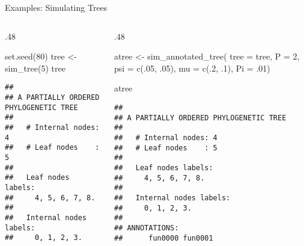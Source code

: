 \documentclass[9pt,handout,ignorenonframetext,]{beamer}
\newenvironment{Shaded}{\begin{snugshade}}{\end{snugshade}}
\newcommand{\KeywordTok}[1]{\textcolor[rgb]{0.94,0.87,0.69}{#1}}
\newcommand{\DataTypeTok}[1]{\textcolor[rgb]{0.87,0.87,0.75}{#1}}
\newcommand{\DecValTok}[1]{\textcolor[rgb]{0.86,0.86,0.80}{#1}}
\newcommand{\StringTok}[1]{\textcolor[rgb]{0.80,0.58,0.58}{#1}}
\newcommand{\NormalTok}[1]{\textcolor[rgb]{0.80,0.80,0.80}{#1}}
\def\begincols{\begin{columns}[T]}
\def\begincol{\begin{column}[T]}
\def\endcol{\end{column}}
\def\endcols{\end{columns}}
\begin{document}
\begin{frame}[fragile,t]{Examples: Simulating Trees}

\begincols

\begincol{.48\textwidth}

\footnotesize

\begin{Shaded}
\begin{Highlighting}[]
\KeywordTok{set.seed}\NormalTok{(}\DecValTok{80}\NormalTok{)}
\NormalTok{tree <-}\StringTok{ }\KeywordTok{sim_tree}\NormalTok{(}\DecValTok{5}\NormalTok{)}
\NormalTok{tree}
\end{Highlighting}
\end{Shaded}

\begin{verbatim}
## 
## A PARTIALLY ORDERED PHYLOGENETIC TREE
## 
##   # Internal nodes: 4
##   # Leaf nodes    : 5
## 
##   Leaf nodes labels: 
##     4, 5, 6, 7, 8.
## 
##   Internal nodes labels:
##     0, 1, 2, 3.
\end{verbatim}

\normalsize

\endcol

\begincol{.48\textwidth}

\footnotesize

\begin{Shaded}
\begin{Highlighting}[]
\NormalTok{atree <-}\StringTok{ }\KeywordTok{sim_annotated_tree}\NormalTok{(}
  \DataTypeTok{tree =}\NormalTok{ tree, }\DataTypeTok{P =} \DecValTok{2}\NormalTok{,}
  \DataTypeTok{psi  =} \KeywordTok{c}\NormalTok{(.}\DecValTok{05}\NormalTok{, .}\DecValTok{05}\NormalTok{),}
  \DataTypeTok{mu   =} \KeywordTok{c}\NormalTok{(.}\DecValTok{2}\NormalTok{, .}\DecValTok{1}\NormalTok{),}
  \DataTypeTok{Pi   =}\NormalTok{ .}\DecValTok{01}\NormalTok{)}

\NormalTok{atree}
\end{Highlighting}
\end{Shaded}

\begin{verbatim}
## 
## A PARTIALLY ORDERED PHYLOGENETIC TREE
## 
##   # Internal nodes: 4
##   # Leaf nodes    : 5
## 
##   Leaf nodes labels: 
##     4, 5, 6, 7, 8.
## 
##   Internal nodes labels:
##     0, 1, 2, 3.
## 
## ANNOTATIONS:
##      fun0000 fun0001
\end{verbatim}

\normalsize

\endcol

\endcols

\end{frame}
\end{document}
